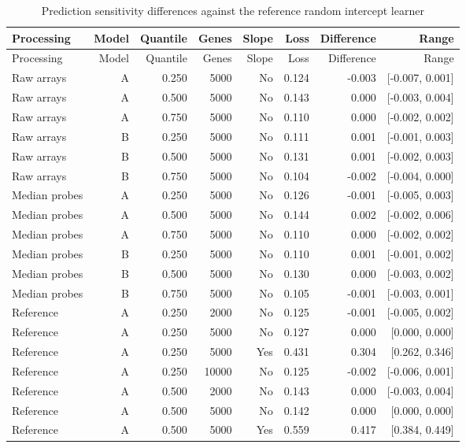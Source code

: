\begin{longtable}{lrrrrrrr}
\caption{Prediction sensitivity differences against the reference random intercept learner}\label{tab:joint-prediction-all}\\
\toprule
Processing & Model & Quantile & Genes & Slope & Loss & Difference & Range \\
\midrule\endfirsthead
\toprule
Processing & Model & Quantile & Genes & Slope & Loss & Difference & Range \\
\midrule\endhead
Raw arrays & A & 0.250 &  5000 & No & 0.124 & -0.003 & [-0.007, 0.001] \\
Raw arrays & A & 0.500 &  5000 & No & 0.143 & 0.000 & [-0.003, 0.004] \\
Raw arrays & A & 0.750 &  5000 & No & 0.110 & 0.000 & [-0.002, 0.002] \\
Raw arrays & B & 0.250 &  5000 & No & 0.111 & 0.001 & [-0.001, 0.003] \\
Raw arrays & B & 0.500 &  5000 & No & 0.131 & 0.001 & [-0.002, 0.003] \\
Raw arrays & B & 0.750 &  5000 & No & 0.104 & -0.002 & [-0.004, 0.000] \\
Median probes & A & 0.250 &  5000 & No & 0.126 & -0.001 & [-0.005, 0.003] \\
Median probes & A & 0.500 &  5000 & No & 0.144 & 0.002 & [-0.002, 0.006] \\
Median probes & A & 0.750 &  5000 & No & 0.110 & 0.000 & [-0.002, 0.002] \\
Median probes & B & 0.250 &  5000 & No & 0.110 & 0.001 & [-0.001, 0.002] \\
Median probes & B & 0.500 &  5000 & No & 0.130 & 0.000 & [-0.003, 0.002] \\
Median probes & B & 0.750 &  5000 & No & 0.105 & -0.001 & [-0.003, 0.001] \\
Reference & A & 0.250 &  2000 & No & 0.125 & -0.001 & [-0.005, 0.002] \\
Reference & A & 0.250 &  5000 & No & 0.127 & 0.000 & [0.000, 0.000] \\
Reference & A & 0.250 &  5000 & Yes & 0.431 & 0.304 & [0.262, 0.346] \\
Reference & A & 0.250 & 10000 & No & 0.125 & -0.002 & [-0.006, 0.001] \\
Reference & A & 0.500 &  2000 & No & 0.143 & 0.000 & [-0.003, 0.004] \\
Reference & A & 0.500 &  5000 & No & 0.142 & 0.000 & [0.000, 0.000] \\
Reference & A & 0.500 &  5000 & Yes & 0.559 & 0.417 & [0.384, 0.449] \\

\end{longtable}
